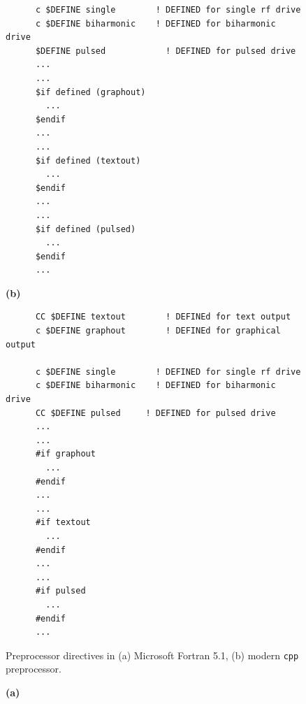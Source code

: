\begin{supplement}
\begin{figure}[p]
\begin{minipage}{\textwidth}
\begin{lstlisting}
      c $DEFINE single        ! DEFINED for single rf drive
      c $DEFINE biharmonic    ! DEFINED for biharmonic drive
      $DEFINE pulsed			! DEFINED for pulsed drive
      ...
      ...
      $if defined (graphout)
      	...
      $endif
      ...
      ...
      $if defined (textout)
      	...
      $endif
      ...
      ...
      $if defined (pulsed)
      	...
      $endif
      ...

\end{lstlisting}
\end{minipage}
%
\hfill
%
\begin{minipage}{\textwidth}
\textbf{(b)}
\begin{lstlisting}
      CC $DEFINE textout		! DEFINEd for text output
      c $DEFINE graphout		! DEFINEd for graphical output
      
      c $DEFINE single        ! DEFINED for single rf drive
      c $DEFINE biharmonic    ! DEFINED for biharmonic drive
      CC $DEFINE pulsed		! DEFINED for pulsed drive
      ...
      ...
      #if graphout
      	...
      #endif
      ...
      ...
      #if textout
      	...
      #endif
      ...
      ...
      #if pulsed
      	...
      #endif
      ...

\end{lstlisting}
\end{minipage}

\caption{Preprocessor directives in (a) Microsoft Fortran 5.1, (b) modern \texttt{cpp} preprocessor.}
\label{fig:preprocessor}
\end{figure}




\begin{figure}[p]
\centering

\begin{minipage}{\textwidth}
\textbf{(a)}


\end{minipage}
\end{figure}
\end{supplement}
